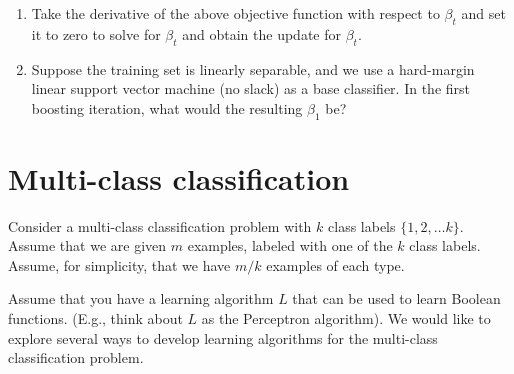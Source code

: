 \documentclass[11pt]{article}
\begin{document}
\begin{enumerate}
\item {}
Take the derivative of the above objective function with respect to $\beta_t$ and set it to zero to solve for $\beta_t$ and obtain the update for $\beta_t$.


\item {} Suppose the training set is linearly separable, and we use a hard-margin linear support vector machine (no slack) as a base classifier. In the first boosting iteration, what would the resulting $\beta_1$ be?

\solution{
}
\end{enumerate}
\fi
\section{Multi-class classification }

Consider a multi-class classification problem with $k$ class
labels $\{1, 2, \ldots k\}$. Assume that we are given $m$
examples, labeled with one of the $k$ class labels. Assume, for
simplicity, that we have $m/k$ examples of each type.

Assume that you have a learning algorithm $L$ that can be used
to learn Boolean functions. (E.g., think about $L$ as the
Perceptron algorithm). We would like to explore several ways to
develop learning algorithms for the multi-class classification
problem.
\end{document}
